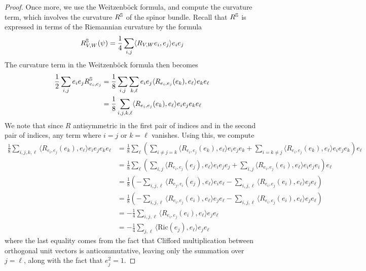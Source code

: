 \begin{proof} %
Once more, we use the Weitzenb\"ock formula, and compute the curvature term, which
involves the curvature $R^\S$ of the spinor bundle. Recall that $R^\S$ is expressed
in terms of the Riemannian curvature by the formula
\[
R^\S_{V,W}(\psi) = \frac{1}{4}\sum_{i, j}\langle R_{V,W}e_i, e_j \rangle e_ie_j
\]
The curvature term in the Weitzenb\"ock formula then becomes
\begin{align*}
\frac{1}{2}\sum_{i,j}e_ie_jR^\S_{e_i,e_j}
&=\frac{1}{8}\sum_{i,j}\sum_{k,\ell}e_ie_j\langle R_{e_i, e_j}(e_k), e_\ell \rangle
e_ke_\ell \\
&= \frac{1}{8}\sum_{i,j,k,\ell} \langle R_{e_i, e_j}(e_k), e_\ell \rangle e_ie_je_ke_\ell
\end{align*}
We note that since $R$ antisymmetric in the first pair of indices and in the
second pair of indices, any term where $i = j$ or $k = \ell$ vanishes.
Using this, we compute
\begin{align*}
\frac{1}{8}\sum_{i,j,k,\ell} \langle R_{e_i, e_j}(e_k), e_\ell \rangle e_ie_je_ke_\ell
&= \frac{1}{8} \sum_\ell \left( \sum_{i \neq j = k}
\langle R_{e_i, e_j}(e_k), e_\ell \rangle e_ie_je_k + \sum_{i = k \neq j}  \langle
R_{e_i, e_j}(e_k), e_\ell \rangle e_ie_je_k\right)e_\ell \\
&= \frac{1}{8}\sum_\ell \left( \sum_{i,j} \langle R_{e_i, e_j}(e_j), e_\ell \rangle
e_ie_je_j + \sum_{i,j} \langle R_{e_i, e_j}(e_i), e_\ell \rangle e_ie_je_i\right)
e_\ell \\
&= \frac{1}{8} \left(-\sum_{i,j,\ell} \langle R_{e_j,e_i}(e_j), e_\ell \rangle
e_ie_\ell - \sum_{i,j,\ell} \langle R_{e_i, e_j}(e_i), e_\ell \rangle e_je_\ell\right) \\
&= \frac{1}{8} \left(-\sum_{i,j,\ell} \langle R_{e_i,e_j}(e_i), e_\ell \rangle
e_je_\ell - \sum_{i,j,\ell} \langle R_{e_i, e_j}(e_i), e_\ell \rangle e_je_\ell\right) \\
&= -\frac{1}{4} \sum_{i,j,\ell} \langle R_{e_i, e_j}(e_i), e_\ell \rangle e_je_\ell \\
&= -\frac{1}{4} \sum_{j, \ell} \langle \mathrm{Ric}(e_j), e_\ell \rangle e_je_\ell
\end{align*}
where the last equality comes from the fact that Clifford multiplication between
orthogonal unit vectors is anticommutative, leaving only the summation over $j = \ell$,
along with the fact that $e_j^2 = 1$.
\end{proof}
%